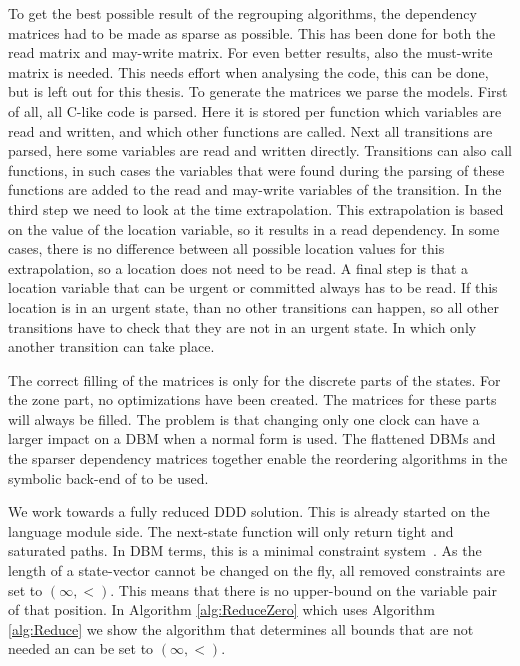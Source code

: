 \label{subsec:matrices}
To get the best possible result of the regrouping algorithms, the dependency matrices had to be made as sparse as possible. This has been done for both the read matrix and may-write matrix. For even better results, also the must-write matrix is needed. This needs effort when analysing the code, this can be done, but is left out for this thesis. To generate the matrices we parse the \uppaal{} models. First of all, all C-like code is parsed. Here it is stored per function which variables are read and written, and which other functions are called. Next all transitions are parsed, here some variables are read and written directly. Transitions can also call functions, in such cases the variables that were found during the parsing of these functions are added to the read and may-write variables of the transition. In the third step we need to look at the time extrapolation. This extrapolation is based on the value of the location variable, so it results in a read dependency. In some cases, there is no difference between all possible location values for this extrapolation, so a location does not need to be read. A final step is that a location variable that can be urgent or committed always has to be read. If this location is in an urgent state, than no other transitions can happen, so all other transitions have to check that they are not in an urgent state. In which only another transition can take place.

The correct filling of the matrices is only for the discrete parts of the states. For the zone part, no optimizations have been created. The matrices for these parts will always be filled. The problem is that changing only one clock can have a larger impact on a DBM when a normal form is used. The flattened DBMs and the sparser dependency matrices together enable the reordering algorithms in the symbolic back-end of \ltsmin{} to be used.

\label{subsection:dbm_reduction}
We work towards a fully reduced DDD solution. This is already started on the language module side. The next-state function will only return tight and saturated paths. In DBM terms, this is a minimal constraint system~\cite{bengtsson2002clocks}. As the length of a state-vector cannot be changed on the fly, all removed constraints are set to $(\infty,<)$. This means that there is no upper-bound on the variable pair of that position. In Algorithm \ref{alg:ReduceZero} which uses Algorithm \ref{alg:Reduce} we show the algorithm that determines all bounds that are not needed an can be set to $(\infty,<)$. 


